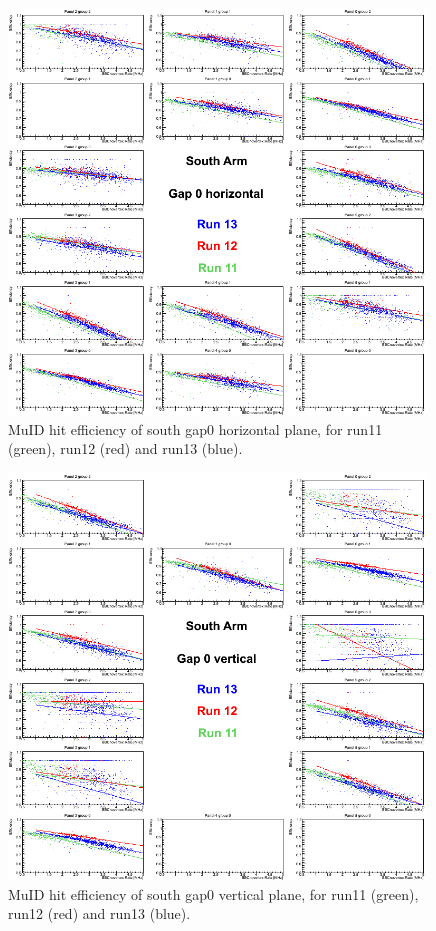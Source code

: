 \begin{figure}[h!]

  \centering
  \includegraphics[width=0.99\textwidth]{./figures/efficomp_South_gap0_horizontal.png}
  \caption{\label{Fig:efficiency:MuIdEff:a0g0p0:app}MuID hit efficiency of south
  gap0 horizontal plane, for run11 (green), run12 (red) and run13 (blue).}
  \label{fig:muid_first_app}
\end{figure}
\clearpage


\begin{figure}[h!]

  \centering
  \includegraphics[width=0.99\textwidth]{./figures/efficomp_South_gap0_vertical.png}
  \caption{\label{Fig:efficiency:MuIdEff:a0g0p1}MuID hit efficiency of south gap0 vertical plane, for run11 (green), run12 (red) and run13 (blue).}
\end{figure}
\clearpage


